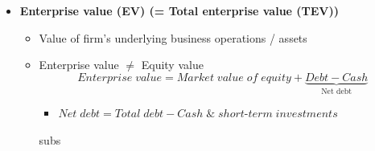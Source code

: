 \documentclass[ieeetran]{article}
\begin{document}
\begin{itemize}
\begin{itemize}
		  \begin{itemize}
		    \item Could be negative
		    \item Many of the valuable assets may not be captured on the balance sheet	
		  \end{itemize}

	 \item \textbf{Market value of equity (= Market capitalization, market cap):}		 	 \large
		  \begin{equation*}
		  \boxed{Market \; value \; of \; equity = 
		  Market \; price \; per \; share * No. \; of \; shares \; outstanding}
		  \end{equation*}
		  \normalsize
		  \begin{itemize}
		    \item Cannot be negative
		    \item Often differs substantially from book value
		  \end{itemize}
	  
	  \item \textbf{Market-to-book (M/B) ratio (= Price-to-book (P/B) ratio):}
		 \large
		  \begin{equation*}
		  \boxed{M/B \; ratio = \frac{Market \; value \; of \; equity}{Book \; value \; of \; equity} 
		  }
		  \end{equation*}
		  \normalsize
		  \begin{itemize}
		    \item Successful firms have M/B ratio higher than 1
		    \item Value Stocks\footnote{A \textbf{value stock} is trading at levels that are \underline{perceived to be below its fundamentals}.}: Low M/B ratios
		    \item Growth stocks\footnote{A \textbf{growth stock} is any share in a company that is \underline{anticipated to grow} at a rate significantly above the average growth for the market \textit{(example: TSLA)}.}: High M/B ratios
		  \end{itemize}

  \end{itemize}
\item \textbf{Enterprise value (EV) (= Total enterprise value (TEV))}
	\begin{itemize}
	  \item Value of firm's underlying business operations / assets
	  \item Enterprise value $\neq$ Equity value 
		  \large
		  \begin{equation*}
		  \boxed{Enterprise \; value = 
		  Market \; value \; of \; equity + \underbrace{Debt - Cash}_\text{Net debt}}
		  \end{equation*}
		  \normalsize
	  \begin{itemize}
	  \item $Net \;  debt = Total \; debt - Cash \;  \& \; short\text{-}term \; investments$
	  \end{itemize}
subs
	\end{itemize}	
\end{itemize}
\end{document}
